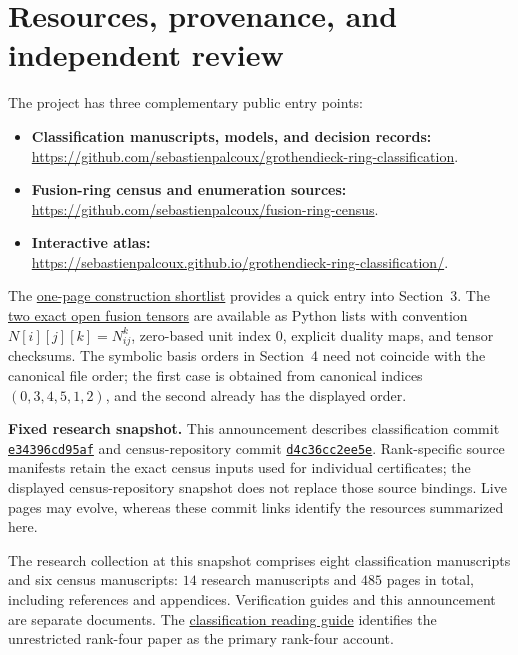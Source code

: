 \documentclass[11pt,a4paper]{article}
\newcommand{\snap}{https://github.com/sebastienpalcoux/grothendieck-ring-classification/blob/e34396cd95aff1090c10974dd934fe6054ca45eb}
\newcommand{\prooflink}[2]{\href{\snap/#1}{#2}}
\begin{document}
\section{Resources, provenance, and independent review}\label{sec:resources}
The project has three complementary public entry points:
\begin{itemize}[itemsep=3pt]
\item \textbf{Classification manuscripts, models, and decision records:}\\
\url{https://github.com/sebastienpalcoux/grothendieck-ring-classification}.
\item \textbf{Fusion-ring census and enumeration sources:}\\
\url{https://github.com/sebastienpalcoux/fusion-ring-census}.
\item \textbf{Interactive atlas:}\\
\url{https://sebastienpalcoux.github.io/grothendieck-ring-classification/}.
\end{itemize}
The \prooflink{docs/New_category_candidates_and_open_cases.pdf}{one-page construction shortlist}
provides a quick entry into Section~3. The
\prooflink{data/remaining_cases.py}{two exact open fusion tensors}
are available as Python lists with convention $N[i][j][k]=N_{ij}^{k}$,
zero-based unit index $0$, explicit duality maps, and tensor checksums.
The symbolic basis orders in Section~4 need not coincide with the
canonical file order; the first case is obtained from canonical indices
$(0,3,4,5,1,2)$, and the second already has the displayed order.

\textbf{Fixed research snapshot.}
This announcement describes classification commit
\href{https://github.com/sebastienpalcoux/grothendieck-ring-classification/tree/e34396cd95aff1090c10974dd934fe6054ca45eb}{\texttt{e34396cd95af}}
and census-repository commit
\href{https://github.com/sebastienpalcoux/fusion-ring-census/tree/d4c36cc2ee5eb5f0e5291de18d2bb433ffb7ce8b}{\texttt{d4c36cc2ee5e}}.
Rank-specific source manifests retain the exact census inputs used for
individual certificates; the displayed census-repository snapshot does not
replace those source bindings. Live pages may evolve, whereas these
commit links identify the resources summarized here.

The research collection at this snapshot comprises eight classification
manuscripts and six census manuscripts: $14$ research manuscripts and
$485$ pages in total, including references and appendices. Verification
guides and this announcement are separate documents. The
\prooflink{manuscripts/README.md}{classification reading guide} identifies
the unrestricted rank-four paper as the primary rank-four account.
\end{document}
